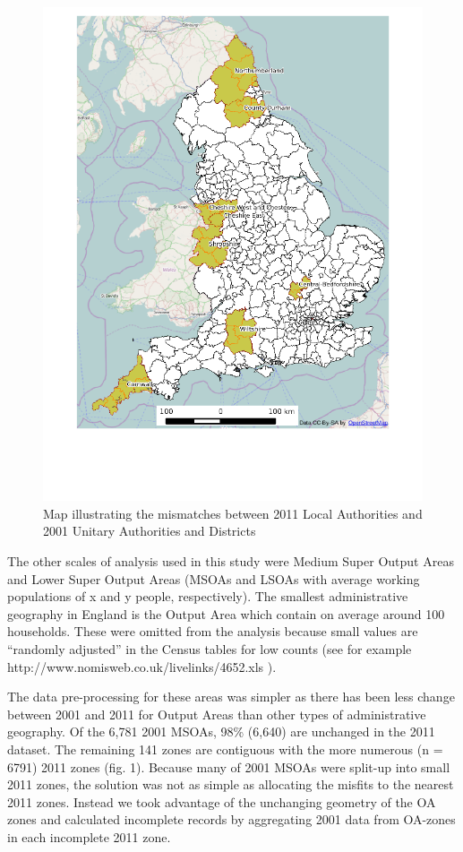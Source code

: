 \begin{figure}[htbp]
\centering
\includegraphics{figure/unnamed-chunk-2.png}
\caption{Map illustrating the mismatches between 2011 Local Authorities
and 2001 Unitary Authorities and Districts}
\end{figure}

The other scales of analysis used in this study were Medium Super Output
Areas and Lower Super Output Areas (MSOAs and LSOAs with average working
populations of x and y people, respectively). The smallest
administrative geography in England is the Output Area which contain on
average around 100 households. These were omitted from the analysis
because small values are ``randomly adjusted'' in the Census tables for
low counts (see for example http://www.nomisweb.co.uk/livelinks/4652.xls
).

The data pre-processing for these areas was simpler as there has been
less change between 2001 and 2011 for Output Areas than other types of
administrative geography. Of the 6,781 2001 MSOAs, 98\% (6,640) are
unchanged in the 2011 dataset. The remaining 141 zones are contiguous
with the more numerous (n = 6791) 2011 zones (fig. 1). Because many of
2001 MSOAs were split-up into small 2011 zones, the solution was not as
simple as allocating the misfits to the nearest 2011 zones. Instead we
took advantage of the unchanging geometry of the OA zones and calculated
incomplete records by aggregating 2001 data from OA-zones in each
incomplete 2011 zone.

